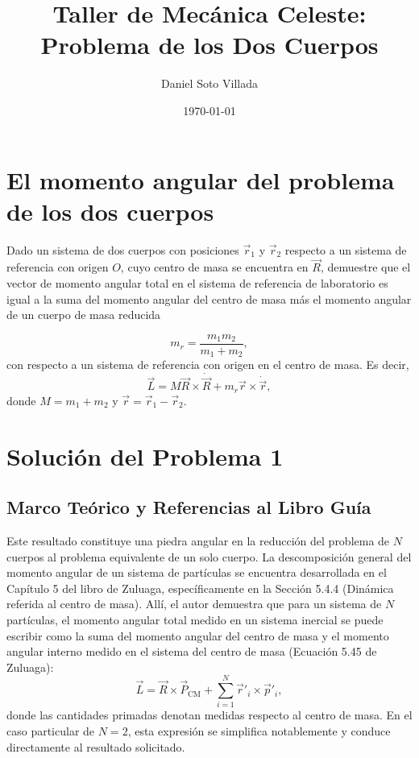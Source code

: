 \documentclass[12pt, a4paper]{article}
\begin{document}
\title{Taller de Mecánica Celeste: Problema de los Dos Cuerpos}
\author{Daniel Soto Villada}
\date{\today}
\maketitle

\section{El momento angular del problema de los dos cuerpos} 

Dado un sistema de dos cuerpos con posiciones $\vec{r}_1$ y $\vec{r}_2$ respecto a un sistema de referencia con origen $O$, cuyo centro de masa se encuentra en $\vec{R}$, demuestre que el vector de momento angular total en el sistema de referencia de laboratorio es igual a la suma del momento angular del centro de masa más el momento angular de un cuerpo de masa reducida

$$m_r = \frac{m_1 m_2}{m_1 + m_2},$$
con respecto a un sistema de referencia con origen en el centro de masa. Es decir,
$$\vec{L} = M \vec{R} \times \dot{\vec{R}} + m_r \vec{r} \times \dot{\vec{r}},$$
donde $M = m_1 + m_2$ y $\vec{r} = \vec{r}_1 - \vec{r}_2$.

\section*{Solución del Problema 1}

\subsection{Marco Teórico y Referencias al Libro Guía}
Este resultado constituye una piedra angular en la reducción del problema de $N$ cuerpos al problema equivalente de un solo cuerpo. La descomposición general del momento angular de un sistema de partículas se encuentra desarrollada en el Capítulo 5 del libro de Zuluaga, específicamente en la Sección 5.4.4 (Dinámica referida al centro de masa). Allí, el autor demuestra que para un sistema de $N$ partículas, el momento angular total medido en un sistema inercial se puede escribir como la suma del momento angular del centro de masa y el momento angular interno medido en el sistema del centro de masa (Ecuación 5.45 de Zuluaga):
$$ \vec{L} = \vec{R} \times \vec{P}_{\text{CM}} + \sum_{i=1}^N \vec{r}'_i \times \vec{p}'_i, $$
donde las cantidades primadas denotan medidas respecto al centro de masa. En el caso particular de $N=2$, esta expresión se simplifica notablemente y conduce directamente al resultado solicitado. 
\end{document}
